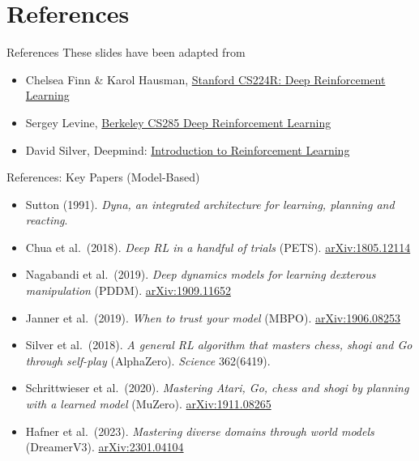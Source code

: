 \section{References}
\begin{frame}{References}
These slides have been adapted from
\begin{itemize}
    \item Chelsea Finn \& Karol Hausman, \href{https://cs224r.stanford.edu/}{Stanford CS224R: Deep
          Reinforcement Learning}
    \item Sergey Levine, \href{https://rail.eecs.berkeley.edu/deeprlcourse/}{Berkeley CS285 Deep Reinforcement Learning}
    \item David Silver, Deepmind: \href{https://www.davidsilver.uk/teaching/}{Introduction to Reinforcement Learning}
\end{itemize}
\end{frame}

\begin{frame}{References: Key Papers (Model-Based)}
\footnotesize
\begin{itemize}
    \item Sutton (1991). \emph{Dyna, an integrated architecture for learning,
          planning and reacting}.
    \item Chua et al.\ (2018). \emph{Deep RL in a handful of trials} (PETS).
          \href{https://arxiv.org/abs/1805.12114}{arXiv:1805.12114}
    \item Nagabandi et al.\ (2019). \emph{Deep dynamics models for learning
          dexterous manipulation} (PDDM). \href{https://arxiv.org/abs/1909.11652}{arXiv:1909.11652}
    \item Janner et al.\ (2019). \emph{When to trust your model} (MBPO).
          \href{https://arxiv.org/abs/1906.08253}{arXiv:1906.08253}
    \item Silver et al.\ (2018). \emph{A general RL algorithm that masters chess,
          shogi and Go through self-play} (AlphaZero). \emph{Science} 362(6419).
    \item Schrittwieser et al.\ (2020). \emph{Mastering Atari, Go, chess and shogi
          by planning with a learned model} (MuZero). \href{https://arxiv.org/abs/1911.08265}{arXiv:1911.08265}
    \item Hafner et al.\ (2023). \emph{Mastering diverse domains through world
          models} (DreamerV3). \href{https://arxiv.org/abs/2301.04104}{arXiv:2301.04104}
\end{itemize}
\end{frame}

